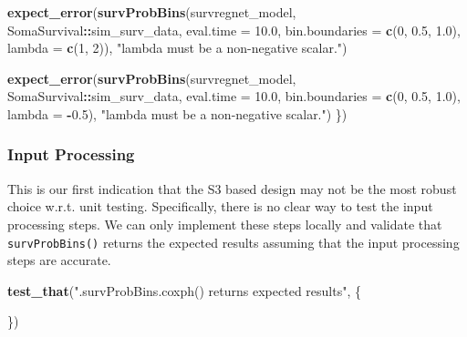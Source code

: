\documentclass[
]{book}
\newenvironment{Shaded}{\begin{snugshade}}{\end{snugshade}}
\newcommand{\AttributeTok}[1]{\textcolor[rgb]{0.13,0.29,0.53}{#1}}
\newcommand{\DecValTok}[1]{\textcolor[rgb]{0.00,0.00,0.81}{#1}}
\newcommand{\FloatTok}[1]{\textcolor[rgb]{0.00,0.00,0.81}{#1}}
\newcommand{\FunctionTok}[1]{\textcolor[rgb]{0.13,0.29,0.53}{\textbf{#1}}}
\newcommand{\NormalTok}[1]{#1}
\newcommand{\SpecialCharTok}[1]{\textcolor[rgb]{0.81,0.36,0.00}{\textbf{#1}}}
\newcommand{\StringTok}[1]{\textcolor[rgb]{0.31,0.60,0.02}{#1}}
\begin{document}
\begin{Shaded}
\begin{Highlighting}[]
  \FunctionTok{expect\_error}\NormalTok{(}\FunctionTok{survProbBins}\NormalTok{(survregnet\_model, SomaSurvival}\SpecialCharTok{::}\NormalTok{sim\_surv\_data,}
                            \AttributeTok{eval.time =} \FloatTok{10.0}\NormalTok{, }\AttributeTok{bin.boundaries =} \FunctionTok{c}\NormalTok{(}\DecValTok{0}\NormalTok{, }\FloatTok{0.5}\NormalTok{, }\FloatTok{1.0}\NormalTok{),}
                            \AttributeTok{lambda =} \FunctionTok{c}\NormalTok{(}\DecValTok{1}\NormalTok{, }\DecValTok{2}\NormalTok{)),}
               \StringTok{"\textasciigrave{}lambda\textasciigrave{} must be a non{-}negative scalar."}\NormalTok{)}
  
  \FunctionTok{expect\_error}\NormalTok{(}\FunctionTok{survProbBins}\NormalTok{(survregnet\_model, SomaSurvival}\SpecialCharTok{::}\NormalTok{sim\_surv\_data,}
                            \AttributeTok{eval.time =} \FloatTok{10.0}\NormalTok{, }\AttributeTok{bin.boundaries =} \FunctionTok{c}\NormalTok{(}\DecValTok{0}\NormalTok{, }\FloatTok{0.5}\NormalTok{, }\FloatTok{1.0}\NormalTok{),}
                            \AttributeTok{lambda =} \SpecialCharTok{{-}}\FloatTok{0.5}\NormalTok{),}
               \StringTok{"\textasciigrave{}lambda\textasciigrave{} must be a non{-}negative scalar."}\NormalTok{)}
\NormalTok{\})}
\end{Highlighting}
\end{Shaded}

\hypertarget{input-processing-3}{%
\subsubsection{Input Processing}\label{input-processing-3}}

This is our first indication that the S3 based design may not be the most robust choice w.r.t. unit testing. Specifically, there is no clear way to test the input processing steps. We can only implement these steps locally and validate that \texttt{survProbBins()} returns the expected results assuming that the input processing steps are accurate.

\begin{Shaded}
\begin{Highlighting}[]
\FunctionTok{test\_that}\NormalTok{(}\StringTok{"\textasciigrave{}.survProbBins.coxph()\textasciigrave{} returns expected results"}\NormalTok{, \{}
  
\NormalTok{\})}
\end{Highlighting}
\end{Shaded}
\end{document}
